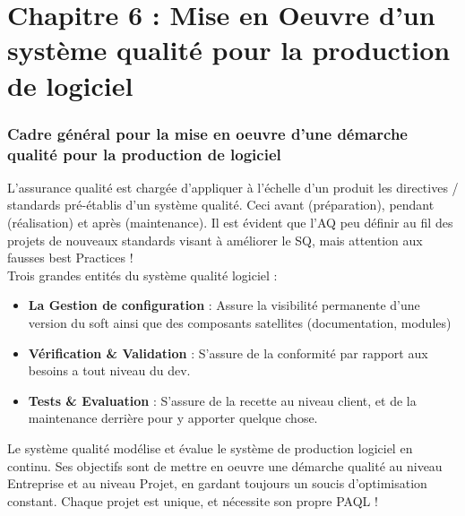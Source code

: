 \part{Chapitre 6 : Mise en Oeuvre d’un système qualité pour la production de logiciel} 

\section{Cadre général pour la mise en oeuvre d’une démarche qualité pour la production de logiciel}


L’assurance qualité est chargée d’appliquer à l’échelle d’un produit les directives / standards pré-établis d’un système qualité. Ceci avant (préparation), pendant (réalisation) et après (maintenance).
Il est évident que l’AQ peu définir au fil des projets de nouveaux standards visant à améliorer le SQ, mais attention aux fausses best Practices ! \\

Trois grandes entités du système qualité logiciel :\\
\begin{itemize}
\item \textbf{La Gestion de configuration} : Assure la visibilité permanente d’une version du soft ainsi que des composants satellites (documentation, modules)
\item \textbf{Vérification \& Validation}  : S’assure de la conformité par rapport aux besoins a tout niveau du dev.
\item \textbf{Tests \& Evaluation} :  S’assure de la recette au niveau client, et de la maintenance derrière pour y apporter quelque chose.
\end{itemize}


Le système qualité modélise et évalue le système de production logiciel en continu. 
Ses objectifs sont de mettre en oeuvre une démarche qualité au niveau Entreprise et au niveau Projet, en gardant toujours un soucis d’optimisation constant.
Chaque projet est unique, et nécessite son propre PAQL !\\

